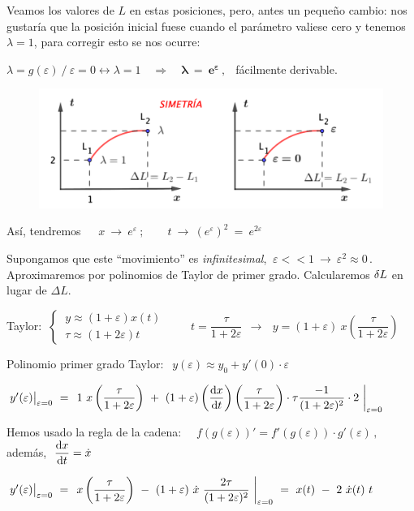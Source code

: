 Veamos los valores de $L$ en estas posiciones, pero, antes un pequeño cambio: nos gustaría que la posición inicial fuese cuando el parámetro valiese cero y tenemos $\lambda=1$, para corregir esto se nos ocurre:

$\lambda=g(\varepsilon) \ / \ \varepsilon=0 \leftrightarrow \lambda=1 \quad \Rightarrow \quad \boldsymbol{\lambda \ = \ e^{\varepsilon} \, , \ \  }$ fácilmente derivable.

\begin{figure}[H]
	\centering
	\includegraphics[width=.8\textwidth]{imagenes/img14-04.png}
\end{figure}

Así, tendremos $\quad \ x \ \to \ e^\varepsilon \ ;\qquad t \ \to \ (e^\varepsilon)^2 \ = \ e^{2\varepsilon}$
 
Supongamos que este ``movimiento'' es \emph{infinitesimal}, $\ \varepsilon<<1 \ \to \ \varepsilon^2 \approx 0\, . \ $ Aproximaremos por polinomios de Taylor de primer grado. Calcularemos $\var L$ en lugar de $\Delta L$.

Taylor: $\ \begin{cases} \ y\approx (1+\varepsilon)x(t) \\ \ \tau \approx (1+2\varepsilon)t \end{cases} \qquad \ t=\dfrac {\tau}{1+2\varepsilon} \ \  \to \ \ \  y = (1+\varepsilon) \ x \left( \dfrac{\tau}{1+2\varepsilon} \right) $

Polinomio primer grado Taylor: $\ \ y(\varepsilon) \approx y_0 + y'(0)\cdot \varepsilon$

$\eval{ y'(\varepsilon) }_{\varepsilon=0} \ = \ \eval{ 1 \ x \left( \dfrac{\tau}{1+2\varepsilon} \right) \ + \ (1+\varepsilon) \displaystyle \left( \dv{x}{t} \right) \left( \dfrac{\tau}{1+2\varepsilon} \right) \cdot \tau \dfrac{-1}{(1+2\varepsilon)^2} \cdot 2  \ }_{\varepsilon=0}$

Hemos usado la regla de la cadena: $\quad \displaystyle f\left( g(\varepsilon) \right)' = f' \left( g(\varepsilon) \right) \cdot g'(\varepsilon)\, , \ $ además, $\ \displaystyle \dv{x}{t}=\dot x$ 


$\eval{y'(\varepsilon)}_{\varepsilon=0} \ = \eval{\ x \left( \dfrac{\tau}{1+2\varepsilon} \right) \ - \ (1+\varepsilon)\ \dot x \ \dfrac{2\tau}{(1+2\varepsilon)^2}\ }_{\varepsilon=0} \ = \ x(t) \ - \ 2 \ \dot x(t) \ t$

